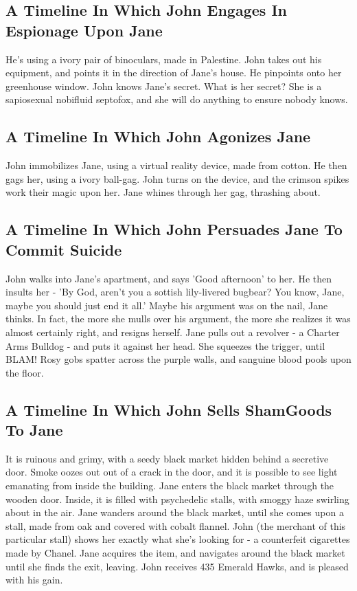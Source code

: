 \documentclass{article}
\begin{document}
\subsection{A Timeline In Which John Engages In Espionage Upon Jane}


He's using a ivory pair of binoculars, made in Palestine.
John takes out his equipment, and points it in the direction of Jane's house. He pinpoints onto her greenhouse window.
John knows Jane's secret. What is her secret? She is a sapiosexual nobifluid septofox, and she will do anything to ensure nobody knows.
\subsection{A Timeline In Which John Agonizes Jane}


John immobilizes Jane, using a virtual reality device, made from cotton.
He then gags her, using a ivory ball{-}gag.
John turns on the device, and the crimson spikes work their magic upon her.
Jane whines through her gag, thrashing about.
\subsection{A Timeline In Which John Persuades Jane To Commit Suicide}


John walks into Jane's apartment, and says 'Good afternoon' to her.
He then insults her {-} 'By God, aren't you a sottish lily{-}livered bugbear?
You know, Jane, maybe you should just end it all.'
Maybe his argument was on the nail, Jane thinks.
In fact, the more she mulls over his argument, the more she realizes it was almost certainly right, and resigns herself.
Jane pulls out a revolver {-} a Charter Arms Bulldog {-} and puts it against her head.
She squeezes the trigger, until BLAM!
Rosy gobs spatter across the purple walls, and sanguine blood pools upon the floor.
\subsection{A Timeline In Which John Sells ShamGoods To Jane}


It is ruinous and grimy, with a seedy black market hidden behind a secretive door.
Smoke oozes out out of a crack in the door, and it is possible to see light emanating from inside the building.
Jane enters the black market through the wooden door.
Inside, it is filled with psychedelic stalls, with smoggy haze swirling about in the air.
Jane wanders around the black market, until she comes upon a stall, made from oak and covered with cobalt flannel.
John (the merchant of this particular stall) shows her exactly what she's looking for {-} a counterfeit cigarettes made by Chanel.
Jane acquires the item, and navigates around the black market until she finds the exit, leaving.
John receives 435 Emerald Hawks, and is pleased with his gain.
\end{document}
